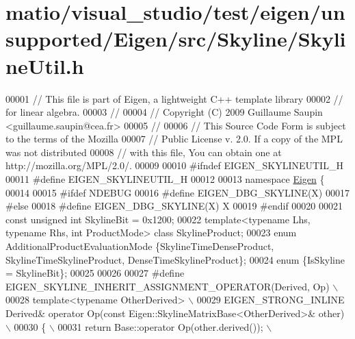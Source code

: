 \hypertarget{matio_2visual__studio_2test_2eigen_2unsupported_2_eigen_2src_2_skyline_2_skyline_util_8h_source}{}\section{matio/visual\+\_\+studio/test/eigen/unsupported/\+Eigen/src/\+Skyline/\+Skyline\+Util.h}
\label{matio_2visual__studio_2test_2eigen_2unsupported_2_eigen_2src_2_skyline_2_skyline_util_8h_source}

\begin{DoxyCode}
00001 \textcolor{comment}{// This file is part of Eigen, a lightweight C++ template library}
00002 \textcolor{comment}{// for linear algebra.}
00003 \textcolor{comment}{//}
00004 \textcolor{comment}{// Copyright (C) 2009 Guillaume Saupin <guillaume.saupin@cea.fr>}
00005 \textcolor{comment}{//}
00006 \textcolor{comment}{// This Source Code Form is subject to the terms of the Mozilla}
00007 \textcolor{comment}{// Public License v. 2.0. If a copy of the MPL was not distributed}
00008 \textcolor{comment}{// with this file, You can obtain one at http://mozilla.org/MPL/2.0/.}
00009 
00010 \textcolor{preprocessor}{#ifndef EIGEN\_SKYLINEUTIL\_H}
00011 \textcolor{preprocessor}{#define EIGEN\_SKYLINEUTIL\_H}
00012 
00013 \textcolor{keyword}{namespace }\hyperlink{namespace_eigen}{Eigen} \{ 
00014 
00015 \textcolor{preprocessor}{#ifdef NDEBUG}
00016 \textcolor{preprocessor}{#define EIGEN\_DBG\_SKYLINE(X)}
00017 \textcolor{preprocessor}{#else}
00018 \textcolor{preprocessor}{#define EIGEN\_DBG\_SKYLINE(X) X}
00019 \textcolor{preprocessor}{#endif}
00020 
00021 \textcolor{keyword}{const} \textcolor{keywordtype}{unsigned} \textcolor{keywordtype}{int} SkylineBit = 0x1200;
00022 \textcolor{keyword}{template}<\textcolor{keyword}{typename} Lhs, \textcolor{keyword}{typename} Rhs, \textcolor{keywordtype}{int} ProductMode> \textcolor{keyword}{class }SkylineProduct;
00023 \textcolor{keyword}{enum} AdditionalProductEvaluationMode \{SkylineTimeDenseProduct, SkylineTimeSkylineProduct, 
      DenseTimeSkylineProduct\};
00024 \textcolor{keyword}{enum} \{IsSkyline = SkylineBit\};
00025 
00026 
00027 \textcolor{preprocessor}{#define EIGEN\_SKYLINE\_INHERIT\_ASSIGNMENT\_OPERATOR(Derived, Op) \(\backslash\)}
00028 \textcolor{preprocessor}{template<typename OtherDerived> \(\backslash\)}
00029 \textcolor{preprocessor}{EIGEN\_STRONG\_INLINE Derived& operator Op(const Eigen::SkylineMatrixBase<OtherDerived>& other) \(\backslash\)}
00030 \textcolor{preprocessor}{\{ \(\backslash\)}
00031 \textcolor{preprocessor}{  return Base::operator Op(other.derived()); \(\backslash\)}

\end{DoxyCode}
